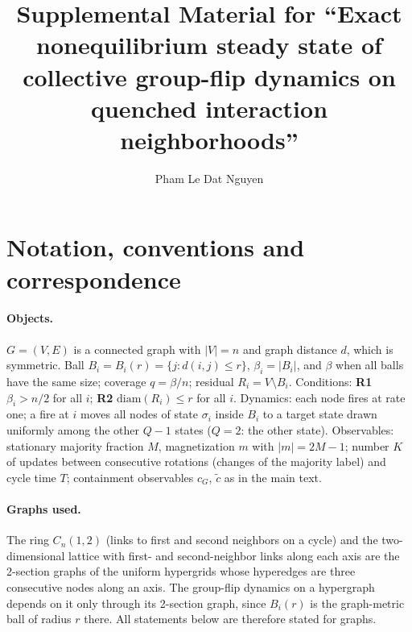 \documentclass[aps,pre,onecolumn,superscriptaddress,amsmath,amssymb,longbibliography]{revtex4-2}
\theoremstyle{definition}
\theoremstyle{remark}
\newcommand{\ctil}{\tilde c}
\newcommand{\cG}{c_G}
\begin{document}
\title{Supplemental Material for ``Exact nonequilibrium steady state of
collective group-flip dynamics on quenched interaction neighborhoods''}

\author{Pham Le Dat Nguyen}

\maketitle

\section{Notation, conventions and correspondence}
\label{sec:S1}

\paragraph*{Objects.} $G=(V,E)$ is a connected graph with $|V|=n$ and
graph distance $d$, which is symmetric. Ball $B_i=B_i(r)=\{j:d(i,j)\le r\}$,
$\beta_i=|B_i|$, and $\beta$ when all balls have the same size; coverage
$q=\beta/n$; residual $R_i=V\setminus B_i$. Conditions: \textbf{R1}
$\beta_i>n/2$ for all $i$; \textbf{R2} $\mathrm{diam}(R_i)\le r$ for all
$i$. Dynamics: each node fires at rate one; a fire at $i$ moves all nodes
of state $\sigma_i$ inside $B_i$ to a target state drawn uniformly among
the other $Q-1$ states ($Q=2$: the other state). Observables: stationary
majority fraction $M$, magnetization $m$ with $|m|=2M-1$; number $K$ of
updates between consecutive rotations (changes of the majority label)
and cycle time $T$; containment observables $\cG$, $\ctil$ as in the main
text.

\paragraph*{Graphs used.} The ring $C_n(1,2)$ (links to first and second
neighbors on a cycle) and the two-dimensional lattice with first- and
second-neighbor links along each axis are the 2-section graphs of the
uniform hypergrids whose hyperedges are three consecutive nodes along an
axis. The group-flip dynamics on a hypergraph depends on it only through
its 2-section graph, since $B_i(r)$ is the graph-metric ball of radius $r$
there. All statements below are therefore stated for graphs.
\end{document}
